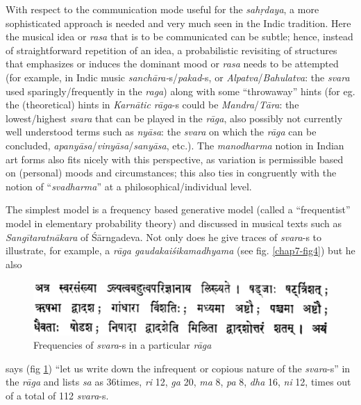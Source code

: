 With respect to the communication mode useful for the \textsl{sahṛdaya}, a more sophisticated approach is needed and very much seen in the Indic tradition. Here the musical idea or \textsl{rasa} that is to be communicated can be subtle; hence, instead of straightforward repetition of an idea, a probabilistic revisiting of structures that emphasizes or induces the dominant mood or \textsl{rasa} needs to be attempted (for example, in Indic music \textsl{sanchāra-}s/\textsl{pakad}-s, or \textsl{Alpatva}/\textsl{Bahulatva}: the \textsl{svara} used sparingly/frequently in the \textsl{raga}) along with some “throwaway” hints (for eg. the (theoretical) hints in \textsl{Karnātic rāga}-s could be \textsl{Mandra}/\textsl{Tāra}: the lowest/highest \textsl{svara} that can be played in the \textsl{rāga}, also possibly not currently well understood terms such as \textsl{nyāsa}: the \textsl{svara} on which the \textsl{rāga} can be concluded, \textsl{apanyāsa}/\textsl{vinyāsa}/\textsl{sanyāsa}, etc.). The \textsl{manodharma} notion in Indian art forms also fits nicely with this perspective, as variation is permissible based on (personal) moods and circumstances; this also ties in congruently with the notion of “\textsl{svadharma}” at a philosophical/individual level.

The simplest model is a frequency based generative model (called a “frequentist” model in elementary probability theory) and discussed in musical texts such as \textsl{Sangītaratnākara} of Śārngadeva. Not only does he give traces of \textsl{svara}-s to illustrate, for example, a \textsl{rāga gaudakaiśikamadhyama} (see fig. \ref{chap7-fig4}) but he also 
\begin{figure}[H]
\centering
\includegraphics[scale=.35]{figures/5.eps}
\caption{Frequencies of \textsl{svara}-s in a particular \textsl{rāga}}\label{chap7-fig3}
\end{figure}
says (fig \ref{chap7-fig3}) “let us write down the infrequent or copious nature of the \textsl{svara}-s” in the \textsl{rāga} and lists \textsl{sa} as 36times, \textsl{ri} 12, \textsl{ga} 20, \textsl{ma} 8, \textsl{pa} 8, \textsl{dha} 16, \textsl{ni} 12, times out of a total of 112 \textsl{svara}-s. 

